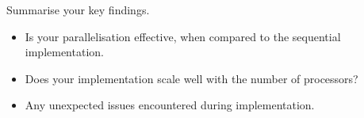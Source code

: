 Summarise your key findings.
\begin{itemize}
  \item Is your parallelisation effective, when compared to the sequential implementation. 
  \item Does your implementation scale well with the number of processors?
  \item Any unexpected issues encountered during implementation. 
\end{itemize}

